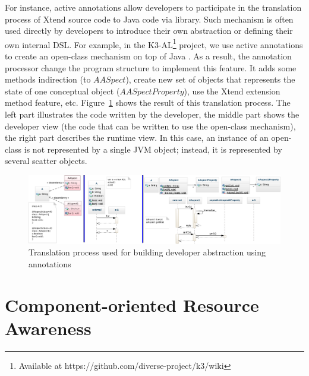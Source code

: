 For instance, active annotations allow developers to participate in the translation process of Xtend source code to Java code via library.
Such mechanism is often used directly by developers to introduce their own abstraction or defining their own internal DSL. 
For example, in the K3-AL\footnote{Available at https://github.com/diverse-project/k3/wiki} project, we use active annotations to create an open-class mechanism on top of Java \cite{Clifton:2000:MMO:353171.353181}. 
As a result, the annotation processor change the program structure to implement this feature. 
It adds some methods indirection (to $AASpect$), create new set of objects that represents the state of one conceptual object ($AASpectProperty$), use the Xtend extension method feature, etc.
Figure~\ref{fig:k3-diagram} shows the result of this translation process. 
The left part illustrates the code written by the developer, the middle part shows the developer view (the code that can be written to use the open-class mechanism), the right part describes the runtime view.
In this case, an instance of an open-class is not represented by a single JVM object; instead, it is represented by several scatter objects.  

\begin{figure}
\centering
\includegraphics[width=0.9\linewidth]{chapter2/fig/famous}
\caption{Translation process used for building developer abstraction using annotations}
\label{fig:k3-diagram}
\end{figure}

\section{Component-oriented Resource Awareness} \label{sec:components-oriented-resource-awareness}


